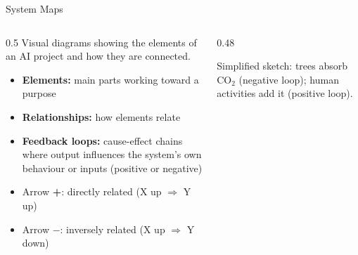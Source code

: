 \documentclass[aspectratio=169,11pt]{beamer}
\begin{document}
\begin{frame}{System Maps}
  \begin{columns}[T]
    \begin{column}{0.5\textwidth}
      \small
      Visual diagrams showing the elements of an AI project and how they are connected.
      \begin{itemize}
        \item \textbf{Elements:} main parts working toward a purpose
        \item \textbf{Relationships:} how elements relate
        \item \textbf{Feedback loops:} cause-effect chains where output influences the system's own behaviour or inputs (positive or negative)
        \item Arrow \textbf{+}: directly related (X up $\Rightarrow$ Y up)
        \item Arrow \textbf{$-$}: inversely related (X up $\Rightarrow$ Y down)
      \end{itemize}
    \end{column}
    \begin{column}{0.48\textwidth}
      {\scriptsize Simplified sketch: trees absorb CO$_2$ (negative loop); human activities add it (positive loop).}
    \end{column}
  \end{columns}
\end{frame}

\end{document}
